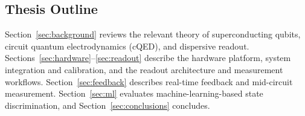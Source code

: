 \subsection{Thesis Outline}

Section~\ref{sec:background} reviews the relevant theory of superconducting
qubits, circuit quantum electrodynamics (cQED), and dispersive readout.
Sections~\ref{sec:hardware}--\ref{sec:readout} describe the hardware platform,
system integration and calibration, and the readout architecture and measurement
workflows.  Section~\ref{sec:feedback} describes real-time feedback and
mid-circuit measurement.  Section~\ref{sec:ml} evaluates machine-learning-based
state discrimination, and Section~\ref{sec:conclusions} concludes.
